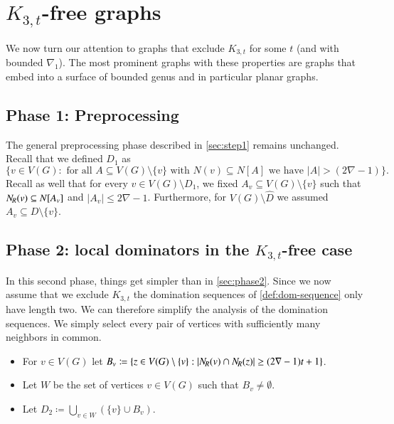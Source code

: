 

\section{$K_{3,t}$-free graphs}

We now turn our attention to graphs 
that exclude $K_{3,t}$ for some $t$ (and with bounded $\nabla_1$). 
The most prominent graphs
with these properties are graphs that embed into a surface of bounded
genus and in particular planar graphs. 


\subsection{Phase 1: Preprocessing}

The general preprocessing phase described in \cref{sec:step1} remains 
unchanged. Recall that we defined $D_1$ as $\{v\in V(G) : \text{ for all } A\subseteq V(G)\setminus \{v\} \text{ with $N(v)\subseteq N[A]$ we have $|A|> (2\nabla-1)\}$}.$ Recall as well that for every $v\in V(G)\setminus D_1$, we fixed
  $A_v\subseteq V(G)\setminus \{v\}$ such that
  $N_{\hspace{-1pt}R}(v)\subseteq N[A_v]$ and $|A_v|\leq 2\nabla-1$. Furthermore, 
  for $V(G)\setminus \hat{D}$ we
assumed $A_v\subseteq D\setminus\{v\}$.
 
\subsection{Phase 2: local dominators in the $K_{3,t}$-free case}\label{sec:D2}

In this second phase, things get simpler than in \cref{sec:phase2}. Since
we now assume that we exclude $K_{3,t}$ the domination sequences of \cref{def:dom-sequence} only have
length two. We can therefore simplify the analysis of the domination sequences. We simply select every pair
of vertices with sufficiently many neighbors in common.

\begin{tcolorbox}[colback=red!5!white,colframe=red!50!black]
\begin{itemize}
\item For $v\in V(G)$ let
  $B_v\coloneqq \{z\in V(G)\setminus \{v\}: |N_{\hspace{-1pt}R}(v)\cap N_{\hspace{-1pt}R}(z)|\geq
  (2\nabla-1)t+1\}$.\smallskip
\item Let $W$ be the set of vertices $v\in V(G)$ such that
  $B_v \neq \emptyset$.\smallskip
\item Let $D_2\coloneqq \bigcup\limits_{v\in W} (\{v\}\cup B_v)$.
\end{itemize}
\end{tcolorbox}

